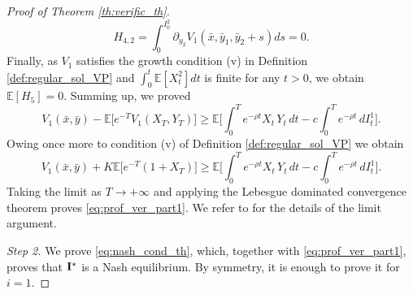 \documentclass[10pt]{article}
\numberwithin{equation}{section}
\theoremstyle{plain}
\numberwithin{theorem}{section}
\theoremstyle{definition}
\newcommand{\<}{\langle}
\renewcommand{\>}{\rangle}
\renewcommand{\(}{\left(}
\renewcommand{\)}{\right)}
\newcommand\Eb{\mathbb{E}}
\newcommand\Lb{\mathbb{L}}
\newcommand\Pb{\mathbb{P}}
\newcommand\contr{{\bf I}}
\begin{document}
{{{\begin{proof}[Proof of Theorem \ref{th:verific_th}]
\begin{equation}%
{H}_{4,2} = \int_{0}^{I^2_0} \partial_{y_2} V_1 (\bar{x} , \bar{y}_{1}  , \bar{y}_{2} + s ) ds =  0 . %
\end{equation}
Finally, as $V_1$ satisfies the growth condition (v) in Definition \ref{def:regular_sol_VP} and $\int_0^t \Eb[X^2_t] dt$ is finite for any $t>0$,
 we obtain $\Eb[H_5] = 0$. 
Summing up, we proved
\begin{equation}%
V_1(\bar{x}, \bar{y}) - \Eb\big[  e^{- T } V_1(X_{ T }, Y_{ T }) \big] \geq 
\Eb\Big[     \int_{0}^{ T } e^{-\rho  t} X_t\,  Y_t \,  dt -  c \int_{0}^{ T } e^{-\rho  t} \, d I^1_t   \Big].
\end{equation}
Owing once more to condition (v) of Definition \ref{def:regular_sol_VP} we obtain
\begin{equation}%
V_1(\bar{x}, \bar{y}) + K \Eb\big[  e^{- T } (1 + X_{ T }) \big] \geq 
\Eb\Big[     \int_{0}^{ T } e^{-\rho  t} X_t\,  Y_t \,  dt -  c \int_{0}^{ T } e^{-\rho  t} \, d I^1_t   \Big].
\end{equation}
Taking the limit as $ T \to + \infty$ and applying the Lebesgue dominated convergence theorem proves \eqref{eq:prof_ver_part1}. We refer to \cite[Section 3 and Appendix B]{MR4305783} for the details of the limit argument.


\vspace{2pt}

\emph{Step 2.} We prove \eqref{eq:nash_cond_th}, which, together with \eqref{eq:prof_ver_part1}, proves that $\contr^{\star}$ is a Nash equilibrium. By symmetry, it is enough to prove it for $i=1$.


\end{proof}}}}
\end{document}
